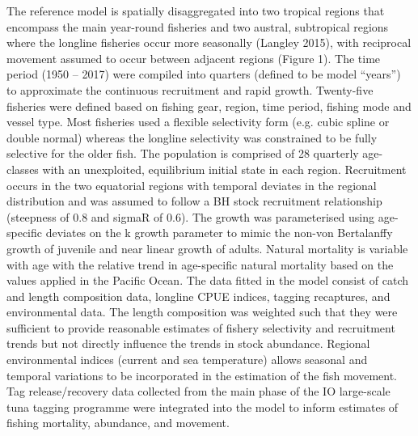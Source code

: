 {The reference model is spatially disaggregated into two tropical regions that encompass the main year-round fisheries and two austral, subtropical regions where the longline fisheries occur more seasonally (Langley 2015), with reciprocal movement assumed to occur between adjacent regions (Figure 1).  The time period (1950 – 2017) were compiled into quarters (defined to be model “years”) to approximate the continuous recruitment and rapid growth. Twenty-five fisheries were defined based on fishing gear, region, time period, fishing mode and vessel type. Most fisheries used a flexible selectivity form (e.g. cubic spline or double normal) whereas the longline selectivity was constrained to be fully selective for the older fish.  The population is comprised of 28 quarterly age-classes with an unexploited, equilibrium initial state in each region. Recruitment occurs in the two equatorial regions with temporal deviates in the regional distribution and was assumed to follow a BH stock recruitment relationship (steepness of 0.8 and sigmaR of 0.6). The growth was parameterised using age-specific deviates on the k growth parameter to mimic the non-von Bertalanffy growth of juvenile and near linear growth of adults. Natural mortality is variable with age with the relative trend in age-specific natural mortality based on the values applied in the Pacific Ocean.  The data fitted in the model consist of catch and length composition data, longline CPUE indices, tagging recaptures, and environmental data. The length composition was weighted such that they were sufficient to provide reasonable estimates of fishery selectivity and recruitment trends but not directly influence the trends in stock abundance. Regional environmental indices (current and sea temperature) allows seasonal and temporal variations to be incorporated in the estimation of the fish movement. Tag release/recovery data collected from the main phase of the IO large-scale tuna tagging programme were integrated into the model to inform estimates of fishing mortality, abundance, and movement. 

}
